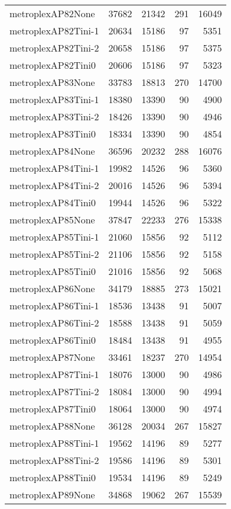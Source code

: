 \begin{longtable}{lrrrr}
metroplexAP82None & 37682 & 21342 & 291 & 16049 \\
metroplexAP82Tini-1 & 20634 & 15186 & 97 & 5351 \\
metroplexAP82Tini-2 & 20658 & 15186 & 97 & 5375 \\
metroplexAP82Tini0 & 20606 & 15186 & 97 & 5323 \\
metroplexAP83None & 33783 & 18813 & 270 & 14700 \\
metroplexAP83Tini-1 & 18380 & 13390 & 90 & 4900 \\
metroplexAP83Tini-2 & 18426 & 13390 & 90 & 4946 \\
metroplexAP83Tini0 & 18334 & 13390 & 90 & 4854 \\
metroplexAP84None & 36596 & 20232 & 288 & 16076 \\
metroplexAP84Tini-1 & 19982 & 14526 & 96 & 5360 \\
metroplexAP84Tini-2 & 20016 & 14526 & 96 & 5394 \\
metroplexAP84Tini0 & 19944 & 14526 & 96 & 5322 \\
metroplexAP85None & 37847 & 22233 & 276 & 15338 \\
metroplexAP85Tini-1 & 21060 & 15856 & 92 & 5112 \\
metroplexAP85Tini-2 & 21106 & 15856 & 92 & 5158 \\
metroplexAP85Tini0 & 21016 & 15856 & 92 & 5068 \\
metroplexAP86None & 34179 & 18885 & 273 & 15021 \\
metroplexAP86Tini-1 & 18536 & 13438 & 91 & 5007 \\
metroplexAP86Tini-2 & 18588 & 13438 & 91 & 5059 \\
metroplexAP86Tini0 & 18484 & 13438 & 91 & 4955 \\
metroplexAP87None & 33461 & 18237 & 270 & 14954 \\
metroplexAP87Tini-1 & 18076 & 13000 & 90 & 4986 \\
metroplexAP87Tini-2 & 18084 & 13000 & 90 & 4994 \\
metroplexAP87Tini0 & 18064 & 13000 & 90 & 4974 \\
metroplexAP88None & 36128 & 20034 & 267 & 15827 \\
metroplexAP88Tini-1 & 19562 & 14196 & 89 & 5277 \\
metroplexAP88Tini-2 & 19586 & 14196 & 89 & 5301 \\
metroplexAP88Tini0 & 19534 & 14196 & 89 & 5249 \\
metroplexAP89None & 34868 & 19062 & 267 & 15539 \\

\end{longtable}
